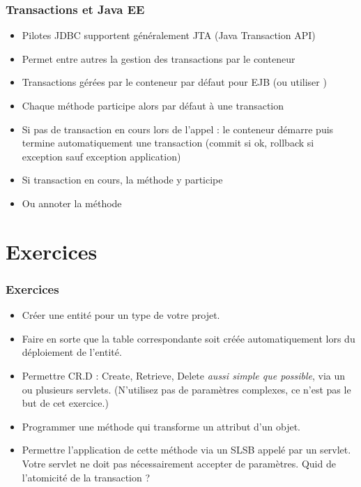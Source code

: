 \documentclass[english, french]{beamer}
\begin{document}
\begin{frame}
	\frametitle{Transactions et Java EE}
	\begin{itemize}
		\item Pilotes JDBC supportent {\tiny généralement} JTA (Java Transaction API)
		\item Permet {\tiny entre autres} la gestion des transactions par le conteneur
		\item Transactions gérées par le conteneur par défaut pour EJB {\tiny (ou utiliser )}
		\item Chaque méthode participe alors par défaut à une transaction
		\item Si pas de transaction en cours lors de l’appel : le conteneur démarre puis termine automatiquement une transaction (commit si ok, rollback si exception {\tiny sauf exception application})
		\item Si transaction en cours, la méthode y participe
		\item Ou annoter la méthode 
	\end{itemize}
\end{frame}

\section{Exercices}
\begin{frame}
	\frametitle{Exercices}
	\begin{itemize}
		\item Créer une entité pour un type de votre projet.
		\item Faire en sorte que la table correspondante soit créée automatiquement lors du déploiement de l’entité.
		\item Permettre CR.D : Create, Retrieve, Delete \emph{aussi simple que possible}, via un ou plusieurs servlets. (N’utilisez pas de paramètres complexes, ce n’est pas le but de cet exercice.)
		\item Programmer une méthode qui transforme un attribut d’un objet.
		\item Permettre l’application de cette méthode via un SLSB appelé par un servlet. Votre servlet ne doit pas nécessairement accepter de paramètres. Quid de l’atomicité de la transaction ?
	\end{itemize}
\end{frame}
\end{document}
